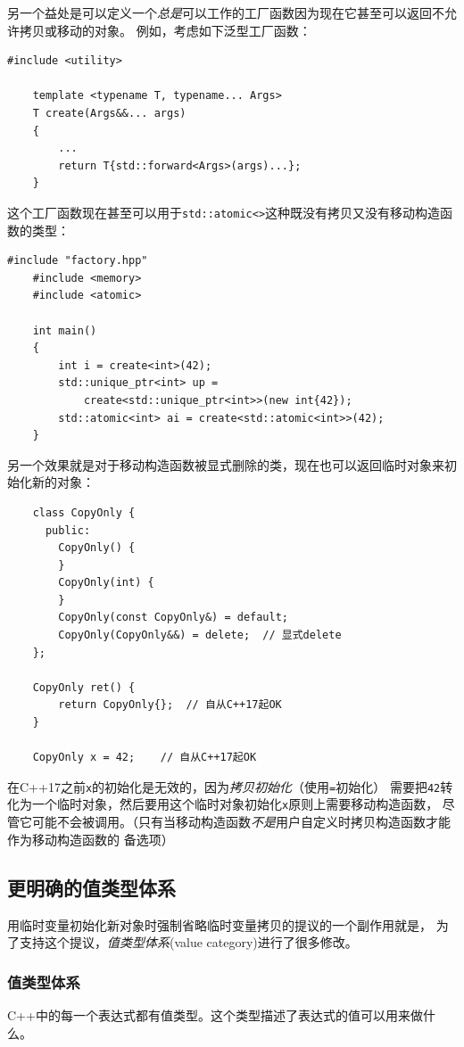 另一个益处是可以定义一个\emph{总是}可以工作的工厂函数因为现在它甚至可以返回不允许拷贝或移动的对象。
例如，考虑如下泛型工厂函数：
\begin{lstlisting}[frame=single, title=lang/factory.hpp]
    #include <utility>

    template <typename T, typename... Args>
    T create(Args&&... args)
    {
        ...
        return T{std::forward<Args>(args)...};
    }
\end{lstlisting}
这个工厂函数现在甚至可以用于\texttt{std::atomic<>}这种既没有拷贝又没有移动构造函数的类型：
\begin{lstlisting}[frame=single, title=lang/factory.cpp]
    #include "factory.hpp"
    #include <memory>
    #include <atomic>

    int main()
    {
        int i = create<int>(42);
        std::unique_ptr<int> up =
            create<std::unique_ptr<int>>(new int{42});
        std::atomic<int> ai = create<std::atomic<int>>(42);
    }
\end{lstlisting}
另一个效果就是对于移动构造函数被显式删除的类，现在也可以返回临时对象来初始化新的对象：
\begin{lstlisting}
    class CopyOnly {
      public:
        CopyOnly() {
        }
        CopyOnly(int) {
        }
        CopyOnly(const CopyOnly&) = default;
        CopyOnly(CopyOnly&&) = delete;  // 显式delete
    };

    CopyOnly ret() {
        return CopyOnly{};  // 自从C++17起OK
    }

    CopyOnly x = 42;    // 自从C++17起OK
\end{lstlisting}
在C++17之前\texttt{x}的初始化是无效的，因为\emph{拷贝初始化}（使用\texttt{=}初始化）
需要把\texttt{42}转化为一个临时对象，然后要用这个临时对象初始化\texttt{x}原则上需要移动构造函数，
尽管它可能不会被调用。（只有当移动构造函数\emph{不是}用户自定义时拷贝构造函数才能作为移动构造函数的
备选项）

\subsection{更明确的值类型体系}
用临时变量初始化新对象时强制省略临时变量拷贝的提议的一个副作用就是，
为了支持这个提议，\emph{值类型体系}(value category)进行了很多修改。

\subsubsection{值类型体系}\label{ch5.3.1}
C++中的每一个表达式都有值类型。这个类型描述了表达式的值可以用来做什么。

